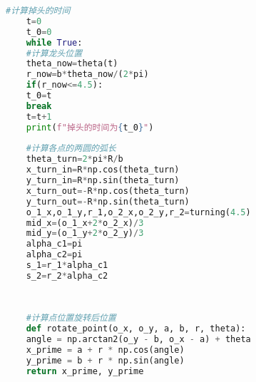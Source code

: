 \documentclass[withoutpreface,bwprint]{cumcmthesis} %
\begin{document}
\begin{lstlisting}[language=Python]
	#计算掉头的时间
	t=0
	t_0=0
	while True:
	#计算龙头位置
	theta_now=theta(t)
	r_now=b*theta_now/(2*pi)
	if(r_now<=4.5):
	t_0=t
	break
	t=t+1
	print(f"掉头的时间为{t_0}")
	
	#计算各点的两圆的弧长
	theta_turn=2*pi*R/b
	x_turn_in=R*np.cos(theta_turn)
	y_turn_in=R*np.sin(theta_turn)
	x_turn_out=-R*np.cos(theta_turn)
	y_turn_out=-R*np.sin(theta_turn)
	o_1_x,o_1_y,r_1,o_2_x,o_2_y,r_2=turning(4.5)
	mid_x=(o_1_x+2*o_2_x)/3
	mid_y=(o_1_y+2*o_2_y)/3
	alpha_c1=pi
	alpha_c2=pi
	s_1=r_1*alpha_c1
	s_2=r_2*alpha_c2
	
	
	
	#计算点位置旋转后位置
	def rotate_point(o_x, o_y, a, b, r, theta):
	angle = np.arctan2(o_y - b, o_x - a) + theta
	x_prime = a + r * np.cos(angle)
	y_prime = b + r * np.sin(angle)
	return x_prime, y_prime
	

\end{lstlisting}
\end{document}
